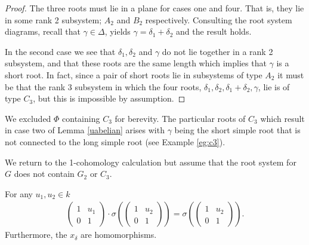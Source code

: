 \begin{proof}
The three roots must lie in a plane for cases one and four. That is, they lie in some rank 2 subsystem; $A_2$ and $B_2$ respectively. Consulting the root system diagrams, recall that $\gamma \in \Delta$, yields $\gamma = \delta_1 + \delta_2$ and the result holds.

In the second case we see that $\delta_1, \delta_2$ and $\gamma$ do not lie together in a rank 2 subsystem, and that these roots are the same length which implies that $\gamma$ is a short root. In fact, since a pair of short roots lie in subsystems of type $A_2$ it must be that the rank 3 subsystem in which the four roots, $\delta_1, \delta_2, \delta_1 + \delta_2, \gamma$, lie is of type $C_3$, but this is impossible by assumption. 
\end{proof}

We excluded $\Phi$ containing $C_3$ for berevity. The particular roots of $C_3$ which result in case two of Lemma \ref{uabelian} arises with $\gamma$ being the short simple root that is not connected to the long simple root (see Example \ref{eg:c3}).

We return to the 1-cohomology calculation but assume that the root system for $G$ does not contain $G_2$ or $C_3$.

\begin{corollary}\label{uact} For any $u_1, u_2 \in k$
\begin{align*}
\left(\begin{matrix}1 & u_1 \\ 0 & 1 \end{matrix}\right)
\cdot
\sigma\left(\left(\begin{matrix} 1 & u_2 \\ 0 & 1\end{matrix}\right)\right)
=
\sigma\left(\left(\begin{matrix} 1 & u_2 \\ 0 & 1\end{matrix}\right)\right).
\end{align*}
Furthermore, the $x_\delta$ are homomorphisms.
\end{corollary}

